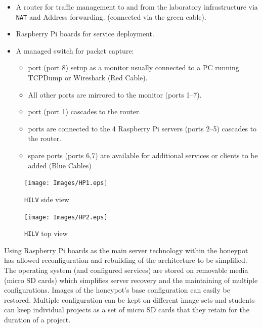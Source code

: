 \documentclass{llncs}
\begin{document}
\begin{itemize}
    \item \noindent A router for traffic management to and from the laboratory
      infrastructure via \texttt{NAT} and Address forwarding. (connected via the
      green cable).  \item {} Raspberry Pi boards for service deployment.
    \item \noindent A managed switch for packet capture:
    \begin{itemize}
        \item {} port (port 8) setup as a monitor usually connected to
          a PC running TCPDump or Wireshark (Red Cable).
        \item \noindent All other ports are mirrored to the monitor (ports
          1--7).
        \item {} port (port 1) cascades to the router.
        \item {} ports are connected to the 4 Raspberry Pi servers
          (ports 2--5) cascades to the router.
        \item {} spare ports (ports 6,7) are available for additional
          services or clients to be added (Blue Cables)
    \end{itemize}
\end{itemize}

\begin{figure}[ht]
  \centering
  \begin{minipage}[h]{0.45\textwidth}
    \texttt{[image: Images/HP1.eps]}
    \caption{\texttt{HILV} side view\label{fig:HP1}}
  \end{minipage}
  \hfill
  \begin{minipage}[h]{0.45\textwidth}
    \texttt{[image: Images/HP2.eps]}
    \caption{\texttt{HILV} top view\label{fig:HP2}}
  \end{minipage}
\end{figure}


Using Raspberry Pi boards as the main server technology within the honeypot has
allowed reconfiguration and rebuilding of the architecture to be simplified.
The operating system (and configured services) are stored on removable media
(micro SD cards) which simplifies server recovery and the maintaining of
multiple configurations. Images of the honeypot's base configuration can easily
be restored. Multiple configuration can be kept on different image sets and
students can keep individual projects as a set of micro SD cards that they
retain for the duration of a project.
\end{document}

